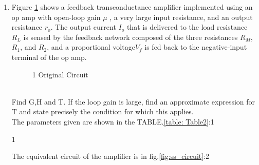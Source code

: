\begin{enumerate}[label=\thesubsection.\arabic*.,ref=\thesubsection.\theenumi]

\item
Figure \ref{fig:original_circuit} shows a feedback transconductance
amplifier implemented using an op amp with open-loop gain $\mu$
, a very large input resistance, and an output resistance $r_{o}$.
The output current $I_{o}$ that is delivered to the load resistance $R_{L}$
is sensed by the feedback network composed of the three
resistances $R_{M}$, $R_{1}$, and $R_{2}$, and a proportional voltage$V_{f}$
is fed back to the negative-input terminal of the op amp.\\

\begin{figure}[!ht]
	\begin{center}
		\resizebox{\columnwidth}{!}{}
	\end{center}
\caption{1 Original Circuit}
\label{fig:original_circuit}
\end{figure}\\


Find G,H and T. If the loop gain is large, find an approximate expression for T
and state precisely the condition for which this applies.\\

\solution
The parameters given are shown in the TABLE.\ref{table: Table2}:1
\begin{table}[!ht]
\centering

\caption{1}
\label{table: Table1}
\end{table}
The equivalent circuit of the amplifier is in fig.\ref{fig:ss_circuit}:2


\end{enumerate}
